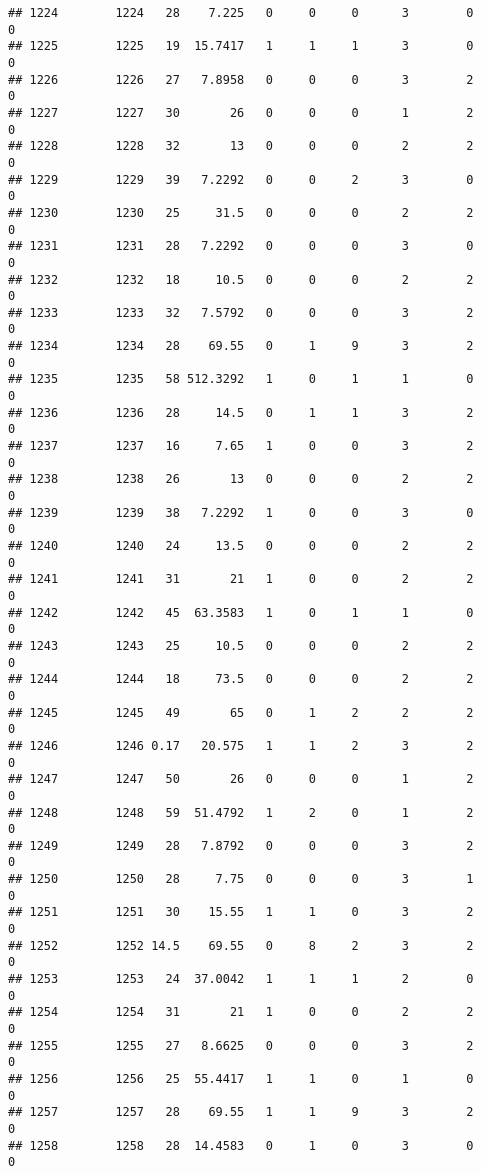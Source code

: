 \documentclass[
]{article}
\begin{document}
\begin{verbatim}
## 1224        1224   28    7.225   0     0     0      3        0         0
## 1225        1225   19  15.7417   1     1     1      3        0         0
## 1226        1226   27   7.8958   0     0     0      3        2         0
## 1227        1227   30       26   0     0     0      1        2         0
## 1228        1228   32       13   0     0     0      2        2         0
## 1229        1229   39   7.2292   0     0     2      3        0         0
## 1230        1230   25     31.5   0     0     0      2        2         0
## 1231        1231   28   7.2292   0     0     0      3        0         0
## 1232        1232   18     10.5   0     0     0      2        2         0
## 1233        1233   32   7.5792   0     0     0      3        2         0
## 1234        1234   28    69.55   0     1     9      3        2         0
## 1235        1235   58 512.3292   1     0     1      1        0         0
## 1236        1236   28     14.5   0     1     1      3        2         0
## 1237        1237   16     7.65   1     0     0      3        2         0
## 1238        1238   26       13   0     0     0      2        2         0
## 1239        1239   38   7.2292   1     0     0      3        0         0
## 1240        1240   24     13.5   0     0     0      2        2         0
## 1241        1241   31       21   1     0     0      2        2         0
## 1242        1242   45  63.3583   1     0     1      1        0         0
## 1243        1243   25     10.5   0     0     0      2        2         0
## 1244        1244   18     73.5   0     0     0      2        2         0
## 1245        1245   49       65   0     1     2      2        2         0
## 1246        1246 0.17   20.575   1     1     2      3        2         0
## 1247        1247   50       26   0     0     0      1        2         0
## 1248        1248   59  51.4792   1     2     0      1        2         0
## 1249        1249   28   7.8792   0     0     0      3        2         0
## 1250        1250   28     7.75   0     0     0      3        1         0
## 1251        1251   30    15.55   1     1     0      3        2         0
## 1252        1252 14.5    69.55   0     8     2      3        2         0
## 1253        1253   24  37.0042   1     1     1      2        0         0
## 1254        1254   31       21   1     0     0      2        2         0
## 1255        1255   27   8.6625   0     0     0      3        2         0
## 1256        1256   25  55.4417   1     1     0      1        0         0
## 1257        1257   28    69.55   1     1     9      3        2         0
## 1258        1258   28  14.4583   0     1     0      3        0         0

\end{verbatim}
\end{document}
